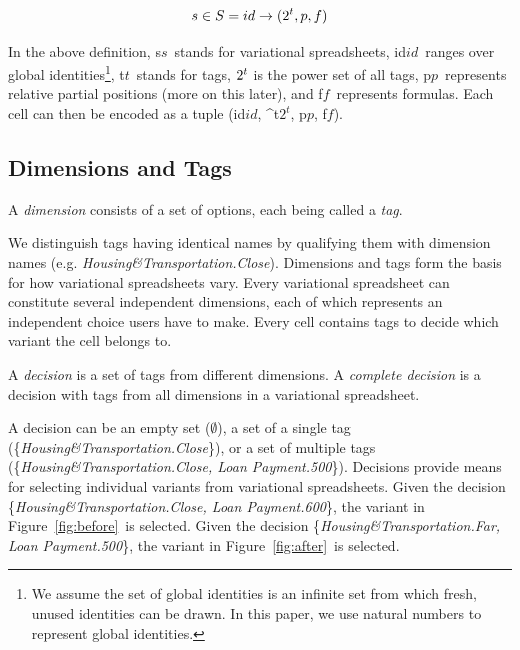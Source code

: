 \documentclass[conference]{IEEEtran}
\def\OB#1{\ifmmode#1\else\mbox{$#1$}\fi}
\newcommand{\spos}{\OB{p}}
\newcommand{\f}{\OB{f}}
\newcommand{\gid}{\OB{id}}
\newcommand{\tg}{\OB{t}}
\newcommand{\tgs}{\OB{2^t}}
\newcommand{\vsheet}{\OB{s}}
\newcommand{\VSheet}{\OB{S}}
\newcommand{\mapname}[1]{\textit{#1}}
\newcommand{\dset}[1]{\{#1\}}
\newcommand{\htdim}{Housing\&Transportation}
\newcommand{\lpdim}{Loan Payment}
\begin{document}
\begin{equation}
\label{eq:vsheet}
\vsheet \in \VSheet = \gid \rightarrow (2^{\tg}, \spos, \f)
\end{equation}

In the above definition, \vsheet~stands for variational spreadsheets, \gid~ranges over global 
identities\footnote{We assume the set of global identities is an
infinite set from which fresh, unused identities can be drawn. In this paper, we use natural numbers to represent global identities.}, 
\tg~stands for tags, $2^{\tg}$ is the power set of all tags, \spos~represents relative partial positions (more on this later), and \f~represents formulas.
Each cell can then be encoded as a tuple (\gid, \tgs, \spos, \f).

\subsection{Dimensions and Tags}
\label{sec:dimtag}

\begin{definition}
A \emph{dimension} consists of a set of options, each being called a \emph{tag}.
\end{definition}

\noindent
We distinguish tags having identical names by qualifying them with dimension names (e.g. \mapname{\htdim.Close}).
Dimensions and tags form the basis for how variational spreadsheets vary.
Every variational spreadsheet can constitute several independent dimensions, each of which represents an independent choice users have to make.
Every cell contains tags to decide which variant the cell belongs to.

\begin{definition}
A \emph{decision} is a set of tags from different dimensions.
A \emph{complete decision} is a decision with tags from all dimensions in a variational spreadsheet.
\end{definition}

A decision can be an empty set ($\emptyset$), a set of a single tag (\dset{\mapname{\htdim.Close}}), or a set of multiple tags (\dset{\mapname{\htdim.Close, \lpdim.500}}).
Decisions provide means for selecting individual variants from variational spreadsheets.
Given the decision \dset{\mapname{\htdim.Close, \lpdim.600}}, the variant in Figure~\ref{fig:before}~is selected. Given the decision \dset{\mapname{\htdim.Far, \lpdim.500}}, the variant in Figure~\ref{fig:after}~is selected.
\end{document}
